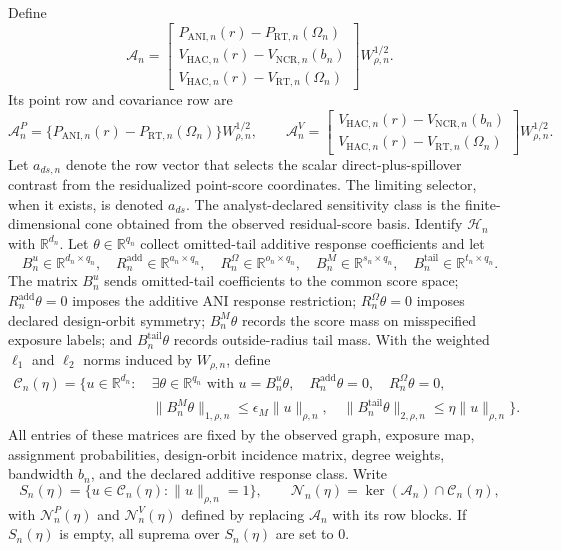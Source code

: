 \documentclass[11pt]{article}
\newcommand{\R}{\mathbb{R}}
\theoremstyle{definition}
\theoremstyle{plain}
\theoremstyle{remark}
\begin{document}
Define
\[
  \mathcal A_n =
  \begin{bmatrix}
  P_{\mathrm{ANI},n}(r)-P_{\mathrm{RT},n}(\Omega_n)\\
  V_{\mathrm{HAC},n}(r)-V_{\mathrm{NCR},n}(b_n)\\
  V_{\mathrm{HAC},n}(r)-V_{\mathrm{RT},n}(\Omega_n)
  \end{bmatrix} W_{\rho,n}^{1/2}.
\]
Its point row and covariance row are
\[
  \mathcal A^P_n
  =
  \{P_{\mathrm{ANI},n}(r)-P_{\mathrm{RT},n}(\Omega_n)\}W_{\rho,n}^{1/2},
  \qquad
  \mathcal A^V_n
  =
  \begin{bmatrix}
  V_{\mathrm{HAC},n}(r)-V_{\mathrm{NCR},n}(b_n)\\
  V_{\mathrm{HAC},n}(r)-V_{\mathrm{RT},n}(\Omega_n)
  \end{bmatrix} W_{\rho,n}^{1/2}.
\]
Let \(a_{ds,n}\) denote the row vector that selects the scalar
direct-plus-spillover contrast from the residualized point-score coordinates.
The limiting selector, when it exists, is denoted \(a_{ds}\).
The analyst-declared sensitivity class is the finite-dimensional cone obtained
from the observed residual-score basis.  Identify
\(\mathcal H_n\) with \(\R^{d_n}\).  Let
\(\theta\in\R^{q_n}\) collect omitted-tail additive response coefficients and
let
\[
  B^u_n\in\R^{d_n\times q_n},\quad
  R^{\mathrm{add}}_n\in\R^{a_n\times q_n},\quad
  R^\Omega_n\in\R^{o_n\times q_n},\quad
  B^M_n\in\R^{s_n\times q_n},\quad
  B^{\mathrm{tail}}_n\in\R^{t_n\times q_n}.
\]
The matrix \(B^u_n\) sends omitted-tail coefficients to the common score
space; \(R^{\mathrm{add}}_n\theta=0\) imposes the additive ANI response
restriction; \(R^\Omega_n\theta=0\) imposes declared design-orbit symmetry;
\(B^M_n\theta\) records the score mass on misspecified exposure labels; and
\(B^{\mathrm{tail}}_n\theta\) records outside-radius tail mass.  With the
weighted \(\ell_1\) and \(\ell_2\) norms induced by \(W_{\rho,n}\), define
\[
\begin{aligned}
\mathcal C_n(\eta)=\{u\in\R^{d_n}:&\ \exists \theta\in\R^{q_n}\text{ with }
u=B^u_n\theta,\quad
R^{\mathrm{add}}_n\theta=0,\quad R^\Omega_n\theta=0,\\
&\ \|B^M_n\theta\|_{1,\rho,n}
     \le \epsilon_M\|u\|_{\rho,n},\quad
   \|B^{\mathrm{tail}}_n\theta\|_{2,\rho,n}
     \le \eta\|u\|_{\rho,n}\}.
\end{aligned}
\]
All entries of these matrices are fixed by the observed graph, exposure map,
assignment probabilities, design-orbit incidence matrix, degree weights,
bandwidth \(b_n\), and the declared additive response class.  Write
\[
  S_n(\eta)=\{u\in\mathcal C_n(\eta):\|u\|_{\rho,n}=1\},
  \qquad
  \mathcal N_n(\eta)=\ker(\mathcal A_n)\cap\mathcal C_n(\eta),
\]
with \(\mathcal N^P_n(\eta)\) and \(\mathcal N^V_n(\eta)\) defined by replacing
\(\mathcal A_n\) with its row blocks.  If \(S_n(\eta)\) is empty, all suprema
over \(S_n(\eta)\) are set to \(0\).
\end{document}
